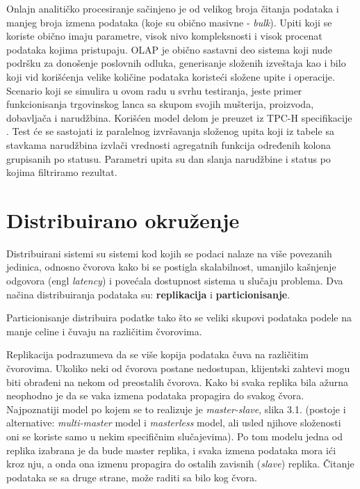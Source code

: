 \documentclass[12pt,oneside]{memoir}
\begin{document}
Onlajn analitičko procesiranje sačinjeno je od velikog broja čitanja podataka i manjeg broja izmena podataka (koje su obično masivne - \textit{bulk}). Upiti koji se koriste obično imaju parametre, visok nivo kompleksnosti i visok procenat podataka kojima pristupaju. OLAP je obično sastavni deo sistema koji nude podršku za donošenje poslovnih odluka, generisanje složenih izveštaja kao i bilo koji vid korišćenja velike količine podataka koristeći složene upite i operacije. Scenario koji se simulira u ovom radu u svrhu testiranja, jeste primer funkcionisanja trgovinskog lanca sa skupom svojih mušterija, proizvoda, dobavljača i narudžbina. Korišćen model delom je preuzet iz TPC-H specifikacije \cite{tpch}. Test će se sastojati iz paralelnog izvršavanja složenog upita koji iz tabele sa stavkama narudžbina izvlači vrednosti agregatnih funkcija određenih kolona grupisanih po statusu. Parametri upita su dan slanja narudžbine i status po kojima filtriramo rezultat.


\section{Distribuirano okruženje}

Distribuirani sistemi su sistemi kod kojih se podaci nalaze na više povezanih jedinica, odnosno čvorova kako bi se postigla skalabilnost, umanjilo kašnjenje odgovora (engl \textit{latency}) i povećala dostupnost sistema u slučaju problema.  Dva načina distribuiranja podataka su: \textbf{replikacija} i \textbf{particionisanje}. 


Particionisanje distribuira podatke tako što se veliki skupovi podataka podele na manje celine i čuvaju na različitim čvorovima. 

Replikacija podrazumeva da se više kopija podataka čuva na različitim čvorovima. Ukoliko neki od čvorova postane nedostupan, klijentski zahtevi mogu biti obrađeni na nekom od preostalih čvorova. Kako bi svaka replika bila ažurna neophodno je da se vaka izmena podataka propagira do svakog čvora. Najpoznatiji model po kojem se to realizuje je \textit{master-slave}, slika 3.1. (postoje i alternative: \textit{multi-master} model i \textit{masterless} model, ali usled njihove složenosti oni se koriste samo u nekim specifičnim slučajevima). Po tom modelu jedna od replika izabrana je da bude master replika, i svaka izmena podataka mora ići kroz nju, a onda ona izmenu propagira do ostalih zavisnih (\textit{slave}) replika. Čitanje podataka se sa druge strane, može raditi sa bilo kog čvora. 
\end{document}
